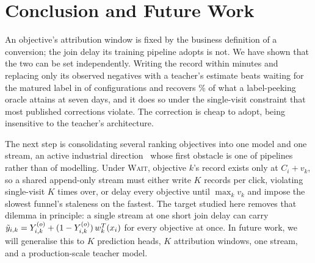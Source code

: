 \section{Conclusion and Future Work}
\label{sec:conclusion}

An objective's attribution window is fixed by the business definition of a conversion; the join
delay its training pipeline adopts is not. We have shown that the two can be set independently. 
Writing the record within minutes and replacing only its observed
negatives with a teacher's estimate beats waiting for the matured label in \cdBeatWait{} of
\nCellsBoth{} configurations and recovers \recoverSeven{}\% of what a label-peeking oracle
attains at seven days, and it does so under the
single-visit constraint that most published corrections violate. The
correction is cheap to adopt, being insensitive to the teacher's architecture.

The next step is consolidating several ranking objectives into one model and one stream, an
active industrial direction~\cite{meta2025gem} whose first obstacle is one of pipelines rather
than of modelling. Under \textsc{Wait}, objective $k$'s record exists only at
$C_i+v_k$, so a shared append-only stream must either write $K$ records per click, violating
single-visit $K$ times over, or delay every objective until $\max_k v_k$ and impose the slowest
funnel's staleness on the fastest. The target studied here removes that dilemma in principle: a
single stream at one short join delay can carry
$\tilde y_{i,k}=Y^{(o)}_{i,k}+(1-Y^{(o)}_{i,k})\,w^{T}_k(x_i)$ for every objective at once. 
In future work, we will generalise this to $K$ prediction heads, $K$
attribution windows, one stream, and a production-scale teacher model.
